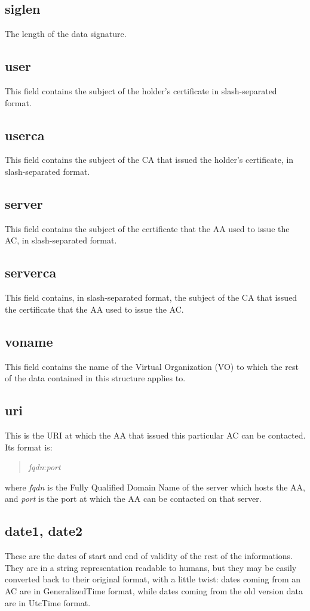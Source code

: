 \documentclass[a4paper]{book}
\begin{document}
\subsection{siglen}
The length of the data signature.

\subsection{user}
This field contains the subject of the holder's certificate in
slash-separated format.

\subsection{userca}
This field contains the subject of the CA that issued the holder's
certificate, in slash-separated format.

\subsection{server}
This field contains the subject of the certificate that the AA used to
issue the AC, in slash-separated format.

\subsection{serverca}
This field contains, in slash-separated format, the subject of the CA that
issued the certificate that the AA used to issue the AC.

\subsection{voname}
This field contains the name of the Virtual Organization (VO) to which
the rest of the data contained in this structure applies to.

\subsection{uri}
This is the URI at which the AA that issued this particular AC can be
contacted. Its format is:
\begin{quote}
\emph{fqdn}:\emph{port}
\end{quote}
where \emph{fqdn} is the Fully Qualified Domain Name of the server
which hosts the AA, and \emph{port} is the port at which the AA can
be contacted on that server.

\subsection{date1, date2}
These are the dates of start and end of validity of the rest of the
informations.  They are in a string representation readable to humans,
but they may be easily converted back to their original format, with a
little twist: dates coming from an AC are in GeneralizedTime format,
while dates coming from the old version data are in UtcTime format.
\end{document}
